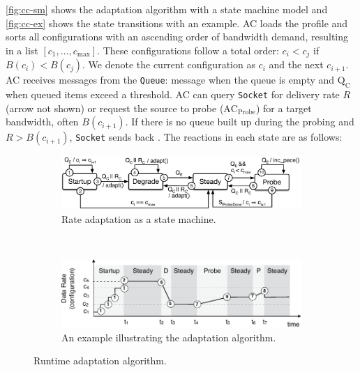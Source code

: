 \autoref{fig:cc-sm} shows the adaptation algorithm with a state machine model
and \autoref{fig:cc-ex} shows the state transitions with an example. AC loads
the profile and sorts all configurations with an ascending order of bandwidth
demand, resulting in a list $[c_1, \dots, c_{\max}]$.  These configurations
follow a total order: $c_i < c_j$ if $B(c_i) < B(c_j)$.  We denote the current
configuration as $c_i$ and the next $c_{i+1}$.  AC receives messages from the
\texttt{Queue}: message \qe{} when the queue is empty and $\text{Q}_\text{C}$
when queued items exceed a threshold. AC can query \texttt{Socket} for delivery
rate $R$ (arrow not shown) or request the source to probe
($\text{AC}_{\text{Probe}}$) for a target bandwidth, often $B(c_{i+1})$. If
there is no queue built up during the probing and $R > B(c_{i+1})$,
\texttt{Socket} sends back \spd{}. The reactions in each state are as follows:

\begin{figure}
  \begin{subfigure}[t]{\columnwidth}
    \centering
    \includegraphics[width=\columnwidth]{figures/cc.pdf}
    \caption{Rate adaptation as a state machine.}
    \vspace{1em}
    \label{fig:cc-sm}
  \end{subfigure}
  \\
  \centering
  \begin{subfigure}[t]{\columnwidth}
    \centering
    \includegraphics[width=0.9\columnwidth]{figures/cc2.pdf}
    \caption{An example illustrating the adaptation algorithm.}
    \label{fig:cc-ex}
  \end{subfigure}
  \caption{Runtime adaptation algorithm.}
  \label{fig:cc}
  \vspace{-1em}
\end{figure}

